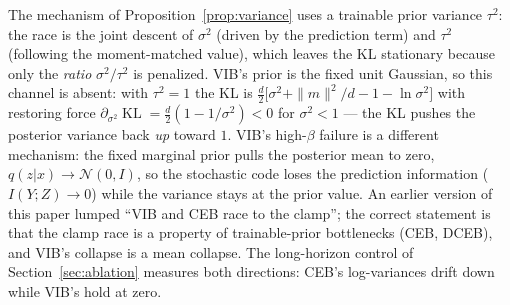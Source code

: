 \begin{remark}\label{rem:vib-prior}
The mechanism of Proposition~\ref{prop:variance} uses a trainable prior variance
$\tau^2$: the race is the joint descent of $\sigma^2$ (driven by the prediction term)
and $\tau^2$ (following the moment-matched value), which leaves the KL stationary
because only the \emph{ratio} $\sigma^2/\tau^2$ is penalized. VIB's prior is the fixed
unit Gaussian, so this channel is absent: with $\tau^2 = 1$ the KL is
$\tfrac{d}{2}\big[\sigma^2 + \|m\|^2/d - 1 - \ln\sigma^2\big]$ with restoring force
$\partial_{\sigma^2}\operatorname{KL} = \tfrac{d}{2}(1 - 1/\sigma^2) < 0$ for
$\sigma^2 < 1$ --- the KL pushes the posterior variance back \emph{up} toward $1$. VIB's
high-$\beta$ failure is a different mechanism: the fixed marginal prior pulls the
posterior mean to zero, $q(z|x) \to \mathcal{N}(0, I)$, so the stochastic code loses the
prediction information ($I(Y;Z) \to 0$) while the variance stays at the prior value.
An earlier version of this paper lumped ``VIB and CEB race to the clamp''; the correct
statement is that the clamp race is a property of trainable-prior bottlenecks (CEB,
DCEB), and VIB's collapse is a mean collapse. The long-horizon control of
Section~\ref{sec:ablation} measures both directions: CEB's log-variances drift down
while VIB's hold at zero.
\end{remark}

